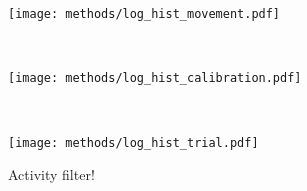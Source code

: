 \documentclass[../main.tex]{subfiles}
\begin{document}

\begin{figure}[H]%
  \begin{minipage}[b]{\linewidth}
    \centering
    \texttt{[image: methods/log\_hist\_movement.pdf]}
    \subcaption{}
    \vspace{4ex}
  \end{minipage}\\
  \begin{minipage}[b]{\linewidth}
    \centering
    \texttt{[image: methods/log\_hist\_calibration.pdf]}
    \subcaption{}
    \vspace{4ex}
  \end{minipage}\\
  \begin{minipage}[b]{\linewidth}
    \centering
    \texttt{[image: methods/log\_hist\_trial.pdf]}
    \subcaption{}
    \vspace{4ex}
  \end{minipage}
  \caption[Log transforming EMG]{Activity filter!}\label{fig:log_hist}
\end{figure}

\end{document}
